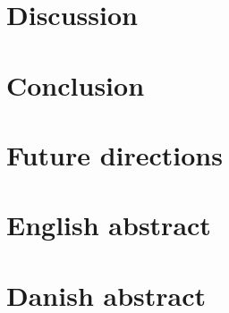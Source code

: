 \documentclass[a4paper, twoside]{report}
\begin{document}
\chapter{Discussion}


\chapter{Conclusion}


\chapter{Future directions}


\chapter{English abstract}


\chapter{Danish abstract}







%

%

%


\newpage
\printbibliography[heading=bibintoc,
title={References}]
\newpage
\end{document}
